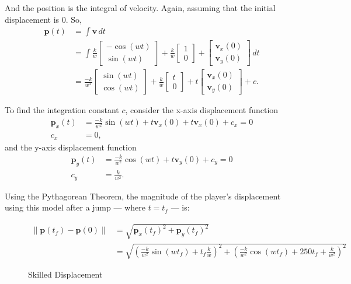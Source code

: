\documentclass[a4paper,12pt]{article}
\newcommand{\tvec}[1]{\boldsymbol{#1}}
\newcommand{\tmag}[1]{\|#1\|}
\newcommand{\tv}{\tvec{v}}
\newcommand{\tp}{\tvec{p}}
\newcommand{\tpar}[2]{\begin{bmatrix}#1\\#2 \end{bmatrix}}
\begin{document}
And the position is the integral of velocity. Again, assuming that the initial displacement is $0$. So,
\begin{align*}
    \tp(t) &= \int \tv \, dt\\
    &= \int \frac{k}{w} \tpar{-\cos(wt)}{\sin(wt)} + \frac{k}{w}\tpar{1}{0} + \tpar{\tv_x(0)}{\tv_y(0)} \, dt\\
    &= \frac{-k}{w^2} \tpar{\sin(wt)}{\cos(wt)} + \frac{k}{w}\tpar{t}{0}  + t\tpar{\tv_x(0)}{\tv_y(0)} + c.
\end{align*}

To find the integration constant $c$, consider the x-axis displacement function
\begin{align*}
    \tp_x(t) &= \frac{-k}{w^2} \sin(wt) + t\tv_x(0) + t\tv_x(0) + c_x = 0\\
    c_x &= 0,
\end{align*}
and the y-axis displacement function
\begin{align*}
    \tp_y(t) &= \frac{-k}{w^2} \cos(wt) + t\tv_y(0) + c_y = 0\\
    c_y &= \frac{k}{w^2}.
\end{align*}

Using the Pythagorean Theorem, the magnitude of the player's displacement using this model after a jump --- where $t=t_f$ --- is:
\begin{figure}[H]
    \centering
    \begin{align*}
        \tmag{\tp(t_f) - \tp(0)} &= \sqrt{\tp_x(t_f)^2 + \tp_y(t_f)^2}\\
        &= \sqrt{\left(\frac{-k}{w^2}\sin(wt_f) + t_f\frac{k}{w} \right)^2 + \left( \frac{-k}{w^2}\cos(wt_f) + 250t_f + \frac{k}{w^2} \right)^2}
    \end{align*}
    \caption{Skilled Displacement}
    \label{eq:2skilled_displacement}

\end{figure}
\end{document}
